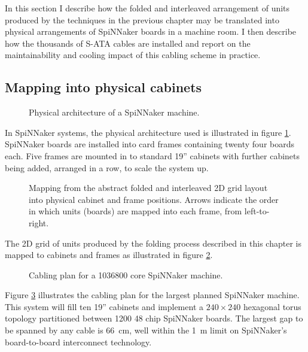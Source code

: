 		In this section I describe how the folded and interleaved arrangement of
		units produced by the techniques in the previous chapter may be translated
		into physical arrangements of SpiNNaker boards in a machine room. I then
		describe how the thousands of S-ATA cables are installed and report on the
		maintainability and cooling impact of this cabling scheme in practice.
		
		\subsection{Mapping into physical cabinets}
			
			\begin{figure}
				\center
				
				\caption{Physical architecture of a SpiNNaker machine.}
				\label{fig:cabinet-units}
			\end{figure}
			
			In SpiNNaker systems, the physical architecture used is illustrated in
			figure \ref{fig:cabinet-units}. SpiNNaker boards are installed into card
			frames containing twenty four boards each. Five frames are mounted in to
			standard 19'' cabinets with further cabinets being added, arranged in a
			row, to scale the system up.
			
			\begin{figure}
				\center
				
				\caption{Mapping from the abstract folded and interleaved 2D grid
				layout into physical cabinet and frame positions. Arrows indicate the
				order in which units (boards) are mapped into each frame, from
				left-to-right.}
				\label{fig:cabinetisation}
			\end{figure}
			
			The 2D grid of units produced by the folding process described in this
			chapter is mapped to cabinets and frames as illustrated in figure
			\ref{fig:cabinetisation}.
			
			\begin{figure}
				\center
				
				\caption{Cabling plan for a \num{1036800} core SpiNNaker machine.}
				\label{fig:million-core-machine}
			\end{figure}
			
			Figure \ref{fig:million-core-machine} illustrates the cabling plan for
			the largest planned SpiNNaker machine. This system will fill ten 19''
			cabinets and implement a $240 \times 240$ hexagonal torus topology
			partitioned between \num{1200} 48 chip SpiNNaker boards. The largest gap
			to be spanned by any cable is \SI{66}{\centi\meter}, well within the
			\SI{1}{\meter} limit on SpiNNaker's board-to-board interconnect
			technology.
			
